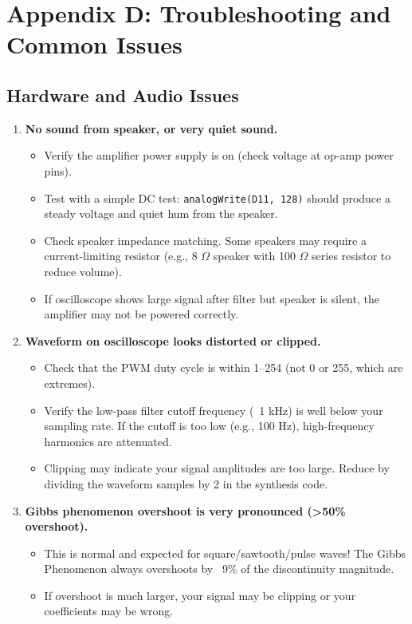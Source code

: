 \documentclass[11pt,letterpaper]{article}
\begin{document}
\clearpage

\section*{Appendix D: Troubleshooting and Common Issues}

\subsection*{Hardware and Audio Issues}

\begin{enumerate}
    \item \textbf{No sound from speaker, or very quiet sound.}
    \begin{itemize}
        \item Verify the amplifier power supply is on (check voltage at op-amp power pins).
        \item Test with a simple DC test: \texttt{analogWrite(D11, 128)} should produce a steady voltage and quiet hum from the speaker.
        \item Check speaker impedance matching. Some speakers may require a current-limiting resistor (e.g., 8 $\Omega$ speaker with 100 $\Omega$ series resistor to reduce volume).
        \item If oscilloscope shows large signal after filter but speaker is silent, the amplifier may not be powered correctly.
    \end{itemize}

    \item \textbf{Waveform on oscilloscope looks distorted or clipped.}
    \begin{itemize}
        \item Check that the PWM duty cycle is within 1--254 (not 0 or 255, which are extremes).
        \item Verify the low-pass filter cutoff frequency (~1 kHz) is well below your sampling rate. If the cutoff is too low (e.g., 100 Hz), high-frequency harmonics are attenuated.
        \item Clipping may indicate your signal amplitudes are too large. Reduce by dividing the waveform samples by 2 in the synthesis code.
    \end{itemize}

    \item \textbf{Gibbs phenomenon overshoot is very pronounced (>50\% overshoot).}
    \begin{itemize}
        \item This is normal and expected for square/sawtooth/pulse waves! The Gibbs Phenomenon always overshoots by ~9\% of the discontinuity magnitude.
        \item If overshoot is much larger, your signal may be clipping or your coefficients may be wrong.
    \end{itemize}


\end{enumerate}
\end{document}
